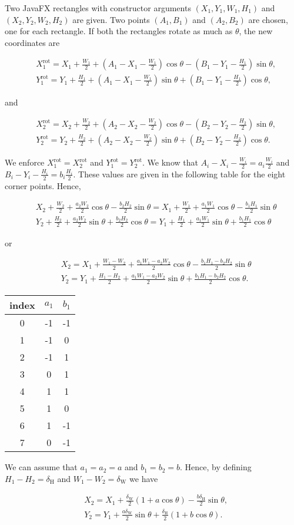 \documentclass{report}
\newcommand{\eqn}[2]{
\begin{equation}\begin{split}
#1
\label{#2}
\end{split}\end{equation}
}
\begin{document}
Two JavaFX rectangles with constructor arguments $(X_1,Y_1,W_1,H_1)$ and $(X_2,Y_2,W_2,H_2)$ are given. Two points $(A_1,B_1)$ and $(A_2,B_2)$ are chosen, one for each rectangle. If both the rectangles rotate as much as $\theta$, the new coordinates are
\eqn{
&
X_1^\text{rot}=
X_1+\frac{W_1}{2}
+\left(A_1-X_1-\frac{W_1}{2}\right)\cos\theta
-\left(B_1-Y_1-\frac{H_1}{2}\right)\sin\theta,
\\&
Y_1^\text{rot}=
Y_1+\frac{H_1}{2}
+\left(A_1-X_1-\frac{W_1}{2}\right)\sin\theta
+\left(B_1-Y_1-\frac{H_1}{2}\right)\cos\theta,
}{}
and
\eqn{
&
X_2^\text{rot}=
X_2+\frac{W_2}{2}
+\left(A_2-X_2-\frac{W_2}{2}\right)\cos\theta
-\left(B_2-Y_2-\frac{H_2}{2}\right)\sin\theta,
\\&
Y_2^\text{rot}=
Y_2+\frac{H_2}{2}
+\left(A_2-X_2-\frac{W_2}{2}\right)\sin\theta
+\left(B_2-Y_2-\frac{H_2}{2}\right)\cos\theta.
}{}
We enforce $X_1^\text{rot}=X_2^\text{rot}$ and $Y_1^\text{rot}=Y_2^\text{rot}$. We know that $A_i-X_i-\frac{W_i}{2}=a_i\frac{W_i}{2}$ and $B_i-Y_i-\frac{H_i}{2}=b_i\frac{H_i}{2}$. These values are given in the following table for the eight corner points. Hence,
\eqn{
&
X_2+\frac{W_2}{2}
+\frac{a_2W_2}{2}\cos\theta
-\frac{b_2H_2}{2}\sin\theta
=
X_1+\frac{W_1}{2}
+\frac{a_1W_1}{2}\cos\theta
-\frac{b_1H_1}{2}\sin\theta
\\&
Y_2+\frac{H_2}{2}
+\frac{a_2W_2}{2}\sin\theta
+\frac{b_2H_2}{2}\cos\theta
=
Y_1+\frac{H_1}{2}
+\frac{a_1W_1}{2}\sin\theta
+\frac{b_1H_1}{2}\cos\theta
}{}
or
\eqn{
&
X_2
=
X_1+\frac{W_1-W_2}{2}
+\frac{a_1W_1-a_2W_2}{2}\cos\theta
-\frac{b_1H_1-b_2H_2}{2}\sin\theta
\\&
Y_2
=
Y_1+\frac{H_1-H_2}{2}
+\frac{a_1W_1-a_2W_2}{2}\sin\theta
+\frac{b_1H_1-b_2H_2}{2}\cos\theta.
}{}

\begin{table}[h]
\centering
\begin{tabular}{|c|c|c|}
\hline
index&$a_1$&$b_1$\\\hline
0&-1&-1\\\hline
1&-1&0\\\hline
2&-1&1\\\hline
3&0&1\\\hline
4&1&1\\\hline
5&1&0\\\hline
6&1&-1\\\hline
7&0&-1\\\hline
\end{tabular}
\end{table}

We can assume that $a_1=a_2=a$ and $b_1=b_2=b$. Hence, by defining $H_1-H_2=\delta_\text{H}$ and $W_1-W_2=\delta_\text{W}$ we have
\eqn{
&
X_2=X_1+\frac{\delta_\text{W}}{2}(1+a\cos\theta)-\frac{b\delta_\text{H}}{2}\sin\theta,
\\&
Y_2=Y_1+\frac{a\delta_\text{W}}{2}\sin\theta+\frac{\delta_\text{H}}{2}(1+b\cos\theta).
}{}
\end{document}
